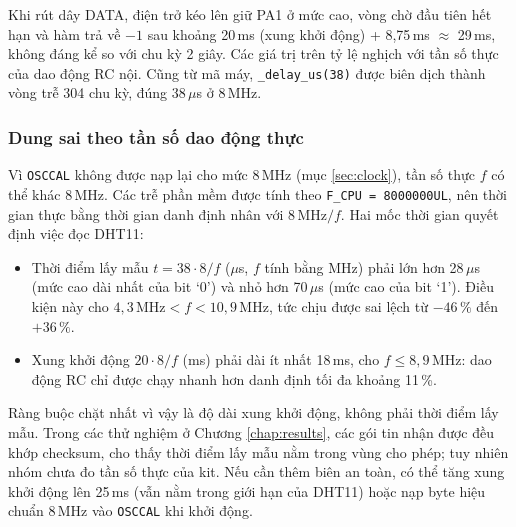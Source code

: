 Khi rút dây DATA, điện trở kéo lên giữ PA1 ở mức cao, vòng chờ đầu tiên hết hạn và hàm trả về $-1$ sau khoảng 20\,ms (xung khởi động) + 8,75\,ms $\approx$ 29\,ms, không đáng kể so với chu kỳ 2 giây. Các giá trị trên tỷ lệ nghịch với tần số thực của dao động RC nội. Cũng từ mã máy, \texttt{\_delay\_us(38)} được biên dịch thành vòng trễ 304 chu kỳ, đúng 38\,$\mu$s ở 8\,MHz.

\subsubsection{Dung sai theo tần số dao động thực}
\label{sec:clock-tolerance}
Vì \texttt{OSCCAL} không được nạp lại cho mức 8\,MHz (mục \ref{sec:clock}), tần số thực $f$ có thể khác 8\,MHz. Các trễ phần mềm được tính theo \texttt{F\_CPU = 8000000UL}, nên thời gian thực bằng thời gian danh định nhân với $8\,\text{MHz}/f$. Hai mốc thời gian quyết định việc đọc DHT11:
\begin{itemize}[leftmargin=1.2cm]
    \item Thời điểm lấy mẫu $t = 38 \cdot 8/f$ ($\mu$s, $f$ tính bằng MHz) phải lớn hơn 28\,$\mu$s (mức cao dài nhất của bit `0') và nhỏ hơn 70\,$\mu$s (mức cao của bit `1'). Điều kiện này cho $4{,}3\,\text{MHz} < f < 10{,}9\,\text{MHz}$, tức chịu được sai lệch từ $-46\,\%$ đến $+36\,\%$.
    \item Xung khởi động $20 \cdot 8/f$ (ms) phải dài ít nhất 18\,ms, cho $f \le 8{,}9\,\text{MHz}$: dao động RC chỉ được chạy nhanh hơn danh định tối đa khoảng 11\,\%.
\end{itemize}
Ràng buộc chặt nhất vì vậy là độ dài xung khởi động, không phải thời điểm lấy mẫu. Trong các thử nghiệm ở Chương \ref{chap:results}, các gói tin nhận được đều khớp checksum, cho thấy thời điểm lấy mẫu nằm trong vùng cho phép; tuy nhiên nhóm chưa đo tần số thực của kit. Nếu cần thêm biên an toàn, có thể tăng xung khởi động lên 25\,ms (vẫn nằm trong giới hạn của DHT11) hoặc nạp byte hiệu chuẩn 8\,MHz vào \texttt{OSCCAL} khi khởi động.

